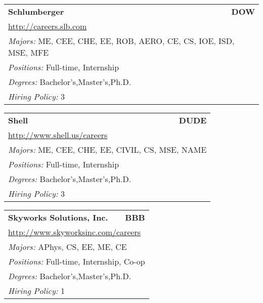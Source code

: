 \documentclass[twoside]{article}
\begin{document}
\begin{center}
\begin{multicols}{3}
\begin{FlushLeft}
\begin{minipage}{\columnwidth}
\end{minipage}
 
\begin{minipage}{\columnwidth}\begin{tabularx}{.95\columnwidth}{Xr}
                 {\Large\bf Schlumberger} & {\Large\bf DOW}\\
    \multicolumn{2}{p{.95\columnwidth}}{\url{http://careers.slb.com}}\\
    \multicolumn{2}{p{.95\columnwidth}}{\emph{Majors:} ME, CEE, CHE, EE, ROB, AERO, CE, CS, IOE, ISD, MSE, MFE}\\
    \multicolumn{2}{p{.95\columnwidth}}{\emph{Positions:} Full-time, Internship}\\
    \multicolumn{2}{p{.95\columnwidth}}{\emph{Degrees:} Bachelor's,Master's,Ph.D.}\\
    \multicolumn{2}{p{.95\columnwidth}}{\emph{Hiring Policy:} 3}\\
    \end{tabularx}
    
\end{minipage}
 
\begin{minipage}{\columnwidth}\begin{tabularx}{.95\columnwidth}{Xr}
                 {\Large\bf Shell} & {\Large\bf DUDE}\\
    \multicolumn{2}{p{.95\columnwidth}}{\url{http://www.shell.us/careers}}\\
    \multicolumn{2}{p{.95\columnwidth}}{\emph{Majors:} ME, CEE, CHE, EE, CIVIL, CS, MSE, NAME}\\
    \multicolumn{2}{p{.95\columnwidth}}{\emph{Positions:} Full-time, Internship}\\
    \multicolumn{2}{p{.95\columnwidth}}{\emph{Degrees:} Bachelor's,Master's,Ph.D.}\\
    \multicolumn{2}{p{.95\columnwidth}}{\emph{Hiring Policy:} 3}\\
    \end{tabularx}
    
\end{minipage}
 
\begin{minipage}{\columnwidth}\begin{tabularx}{.95\columnwidth}{Xr}
                 {\Large\bf Skyworks Solutions, Inc.} & {\Large\bf BBB}\\
    \multicolumn{2}{p{.95\columnwidth}}{\url{http://www.skyworksinc.com/careers}}\\
    \multicolumn{2}{p{.95\columnwidth}}{\emph{Majors:} APhys, CS, EE, ME, CE}\\
    \multicolumn{2}{p{.95\columnwidth}}{\emph{Positions:} Full-time, Internship, Co-op}\\
    \multicolumn{2}{p{.95\columnwidth}}{\emph{Degrees:} Bachelor's,Master's,Ph.D.}\\
    \multicolumn{2}{p{.95\columnwidth}}{\emph{Hiring Policy:} 1}\\
    \end{tabularx}
    

\end{minipage}
\end{FlushLeft}
\end{multicols}
\end{center}
\end{document}
